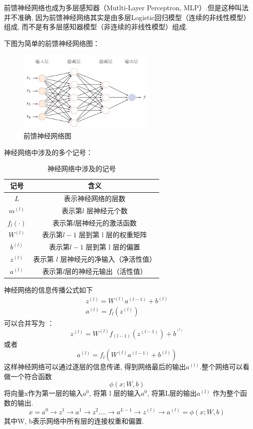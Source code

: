 \documentclass[a4paper]{article}
\theoremstyle{definition}
\numberwithin{equation}{section}
\begin{document}
前馈神经网络也成为多层感知器（Mutlti-Layer Perceptron, MLP）.但是这种叫法并不准确, 因为前馈神经网络其实是由多层Logistic回归模型（连续的非线性模型）组成, 而不是有多层感知器模型（非连续的非线性模型）组成.

下图为简单的前馈神经网络图：

\begin{figure}[!ht]
    \centering
    \includegraphics[width=0.6\textwidth]{FNN}
    \caption{前馈神经网络图}
\end{figure} 


神经网络中涉及的多个记号：
\begin{table}[!ht]
    \renewcommand{\arraystretch}{1.35}  
    \centering
    \begin{tabular}{cc}
        \toprule
        记号 & 含义 \\
        \midrule
        $L$ &表示神经网络的层数\\
$m^{(l)}$&表示第$ l$ 层神经元个数\\
$f_l ( \cdot ) $&表示第$ l $层神经元的激活函数\\
$W^{(l)}$   &表示第$ l-1$ 层到第 l 层的权重矩阵\\
$b^{(l)}$   &表示第$ l-1$ 层到第 l 层的偏置\\
$z^{(l)}$   &表示第 $l$ 层神经元的净输入（净活性值）\\
$a^{(l)}$   &表示第$l$层的神经元输出（活性值）\\
        \bottomrule
    \end{tabular}
\label{tabel:NerualNetwork_mark}
\caption{神经网络中涉及的记号}
\end{table}

神经网络的信息传播公式如下 
\begin{gather*}
 z^{(l)} = W^{(l)}   a^{(l-1)} + b^{(l)}\\
 a^{(l)} = f_l(z^{(l)})
\end{gather*} 
 可以合并写为 ：
$$z^{(l)}=W^{(l)} f_{(l-1)} (z^{(l-1)})+b^{^{(l)}}  $$
或者 
$$a^{(l)} = f_l(W^{(l)} a^{(l-1)} + b^{(l)})$$
这样神经网络可以通过逐层的信息传递, 得到网络最后的输出$a^{(l)}$.整个网络可以看做一个符合函数$$\phi (x; W, b)$$
将向量x作为第一层的输入$a^0$, 将第 l 层的输入$a^0$,  将第L层的输出$a^{(l)}$ 作为整个函数的输出.
$$ x = a^0 \rightarrow z^1 \rightarrow a^1 \rightarrow z^2 .... \rightarrow a^{L-1} \rightarrow z^{(l)} \rightarrow a^{(l)} = \phi (x;W, b)$$
其中W,  b表示网络中所有层的连接权重和偏置. 
\end{document}

